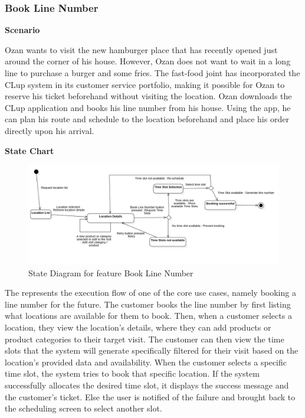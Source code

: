 \subsubsection{Book Line Number}

\textbf{Scenario}

Ozan wants to visit the new hamburger place that has recently opened just around the corner of his house.
However, Ozan does not want to wait in a long line to purchase a burger and some fries.
The fast-food joint has incorporated the CLup system in its customer service portfolio, making it possible for Ozan to reserve his ticket beforehand without visiting the location.
Ozan downloads the CLup application and books his line number from his house.
Using the app, he can plan his route and schedule to the location beforehand and place his order directly upon his arrival.

\textbf{State Chart}

\begin{figure}[H]
    \centering
    \includegraphics[height=0.4\textwidth]{Images/StateCharts/BookLineNumber.png}
    \caption{State Diagram for feature Book Line Number}
    \label{fig:SDBookLine}
\end{figure}

The  represents the execution flow of one of the core use cases, namely booking a line number for the future.
The customer books the line number by first listing what locations are available for them to book.
Then, when a customer selects a location, they view the location's details, where they can add products or product categories to their target visit.
The customer can then view the time slots that the system will generate specifically filtered for their visit based on the location's provided data and availability.
When the customer selects a specific time slot, the system tries to book that specific location.
If the system successfully allocates the desired time slot, it displays the success message and the customer's ticket.
Else the user is notified of the failure and brought back to the scheduling screen to select another slot.


